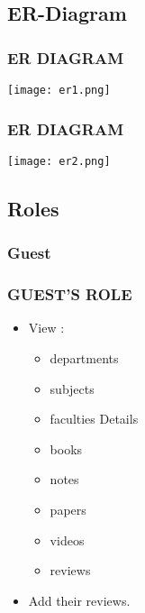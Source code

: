 \documentclass{beamer}
\begin{document}
\subsection{ER-Diagram}
\begin{frame}\frametitle{ER DIAGRAM}
		\texttt{[image: er1.png]}
\end{frame}

\begin{frame}\frametitle{ER DIAGRAM}
		\texttt{[image: er2.png]}
\end{frame}


\subsection{Roles}
\subsubsection{Guest}
\begin{frame}\frametitle{GUEST'S ROLE}
\begin{block}{}
	\begin{itemize}
		\item \textrm View :
\begin{itemize}
\item departments
\item subjects
\item faculties Details
\item books
\item notes
\item papers
\item videos
\item reviews
\end{itemize}

		\item \textrm Add their reviews.

	\end{itemize}
\end{block}
\end{frame} 
\end{document}
